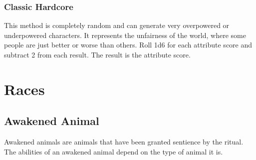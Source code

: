 \begin{comment}
            \subsubsection{Weighted Semi-Randomized Point Buy}
                This method gives you more control over your attribute scores, while still requiring you to deal with attribute score advantages or disadvantages that you might not have chosen. It functions like the semi-randomized point buy method, except that you do not roll 3d6 for every attribute score. You have a pool of 18 dice. You can distribute those dice as you choose between each attribute score, except the last one, which is automatically assigned your remaining points. If you roll more than three dice for an attribute score, keep only the highest 3 dice. If you assign fewer than three dice to roll for an attribute score, add 1 to the result for every die less than 3 you are rolling. You can roll as many as six dice for a single attribute score, and you cannot roll less than one die for an attribute score.

                For example, player hoping to play a barbarian might assign six dice to Strength, five dice to Constitution, three dice to Dexterity, and two dice to each of Intelligence and Perception, leaving the rest of the points to Willpower.
\end{comment}

        \subsubsection{Classic Hardcore}

            This method is completely random and can generate very overpowered or underpowered characters. It represents the unfairness of the world, where some people are just better or worse than others. Roll 1d6 for each attribute score and subtract 2 from each result. The result is the attribute score.

            \newpage

\section{Races}

    \subsection{Awakened Animal}

        Awakened animals are animals that have been granted sentience by the  ritual.
        The abilities of an awakened animal depend on the type of animal it is.

